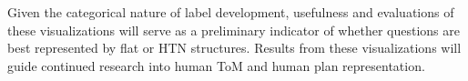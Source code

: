 Given the categorical nature of label development, usefulness and evaluations of these visualizations will serve as a preliminary indicator of whether questions are best represented by flat or HTN structures. Results from these visualizations will guide continued research into human ToM and human plan representation.

